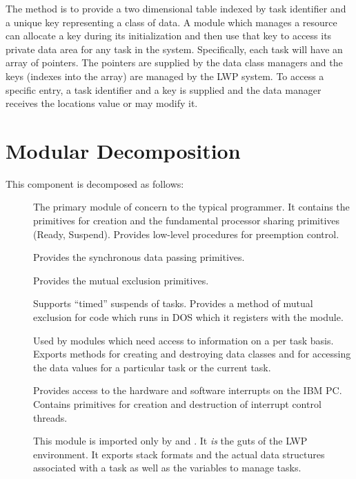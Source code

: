 The method is to provide a two dimensional table indexed by task identifier
and a unique key representing a class of data.  A module which manages
a resource can allocate a key during its initialization and then use
that key to access its private data area for any task in the system.
Specifically, each task will have an array of pointers.  The pointers
are supplied by the data class managers and the keys (indexes into the
array) are managed by the LWP system.  
To access a specific entry, a task identifier and
a key is supplied and the data manager receives the locations value or
may modify it.

\section{Modular Decomposition}
This component is decomposed as follows:
\begin{description}
\item[]
    The primary module of concern to the typical programmer.  It contains
    the primitives for creation and the fundamental processor sharing 
    primitives (Ready, Suspend).  Provides low-level procedures for preemption
    control.
\item[]
    Provides the synchronous data passing primitives.
\item[]
    Provides the mutual exclusion primitives.
\item[]
    Supports ``timed'' suspends of tasks.
    Provides a method of mutual exclusion for code which runs in DOS
    which it registers with the  module.
\item[]
    Used by modules which need access to information on a per task basis.
    Exports methods for creating and destroying data classes and for accessing
    the data values for a particular task or the current task.  
\item[]
    Provides access to the hardware and software interrupts on the IBM
    PC.  Contains primitives for creation and destruction of interrupt
    control threads.
\item[]
    This module is imported only by  and .  
    It {\em is} the guts of the LWP environment.  It exports stack 
    formats and the actual data structures associated with a task 
    as well as the variables to manage tasks.
\end{description}

